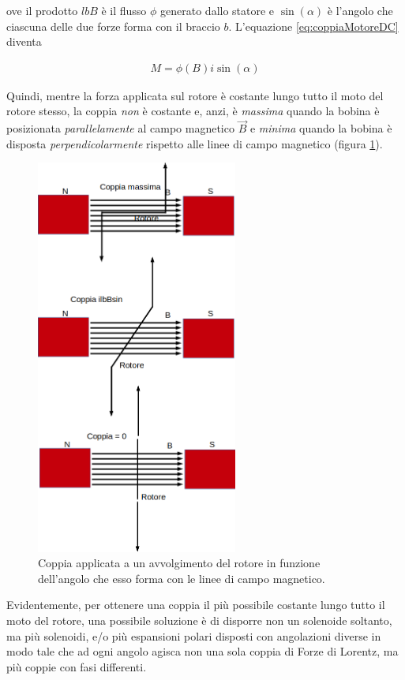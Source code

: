 \documentclass[17pt]{extarticle}
\begin{document}
ove il prodotto  $lbB$ è il flusso $\phi$ generato dallo statore e $\sin(\alpha)$ è l'angolo che ciascuna delle due forze forma con il braccio $b$. L'equazione \ref{eq:coppiaMotoreDC} diventa

\begin{eqnarray}\label{eq:coppiaRotore}
	M = \phi(B)i\sin(\alpha)
\end{eqnarray}

Quindi, mentre la forza applicata sul rotore è costante lungo tutto il moto del rotore stesso, la coppia \emph{non} è costante e, anzi, è \emph{massima} quando la bobina è posizionata \emph{parallelamente} al campo magnetico $\vec{B}$ e \emph{minima} quando la bobina è disposta \emph{perpendicolarmente} rispetto alle linee di campo magnetico (figura \ref{fig:coppiaMotoreDC}). 



\begin{figure}[th!]
	\centering
   	\includegraphics[width=2.6in]{coppiaMotoreDC.png}
  	\caption{Coppia applicata a un avvolgimento del rotore in funzione dell'angolo che esso forma con le linee di campo magnetico.}
   	\label{fig:coppiaMotoreDC}
\end{figure}



Evidentemente, per ottenere una coppia il più possibile costante lungo tutto il moto del rotore, una possibile soluzione è di disporre non un solenoide soltanto, ma più solenoidi, e/o più espansioni polari disposti con angolazioni diverse in modo tale che ad ogni angolo agisca non una sola coppia di Forze di Lorentz, ma più coppie con fasi differenti.
\end{document}
